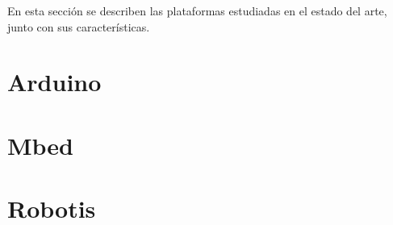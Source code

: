 
En esta sección se describen las plataformas estudiadas en el estado del arte,
junto con sus características.


\section{Arduino}

\section{Mbed}

\section{Robotis}


